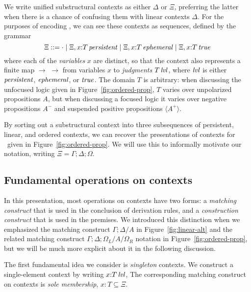 We write unified substructural contexts as either $\Delta$ or $\Xi$,
preferring the latter when there is a chance of confusing them with
linear contexts $\Delta$. For the purposes of encoding \ollll, we can
see these contexts as sequences, defined by the grammar
\[
\Xi ::= \cdot 
  \mid \Xi, x{:}{T}\,{{\it persistent}}
  \mid \Xi, x{:}{T}\,{{\it ephemeral}}
  \mid \Xi, x{:}{T}\,{{\it true}}
\]
where each of the {\em variables} $x$ are distinct, so that the context
also represents a finite map $\to$ $\rightarrow$ from variables $x$ to 
{\it judgments}
${T}\,{{\it lvl}}$, where ${\it lvl}$ is either ${\it persistent}$, ${\it ephemeral}$, or ${\it true}$. 
The domain $T$ is arbitrary: when
discussing the unfocused logic given in Figure~\ref{fig:ordered-prop},
$T$ varies over unpolarized propositions $A$, but when discussing a
focused logic it varies over negative propositions $A^-$ and suspended
positive propositions $\langle A^+ \rangle$. 

By sorting out a substructural context into three subsequences of
persistent, linear, and ordered contexts, we can recover the
presentations of contexts for \ollll~given in
Figure~\ref{fig:ordered-prop}. We will use this to informally motivate
our notation, writing $\Xi = \Gamma; \Delta; \Omega$.




\subsection{Fundamental operations on contexts}

In this presentation, most operations on contexts have two forms: a
{\it matching construct} that is used in the conclusion of derivation
rules, and a {\it construction construct} that is used in the
premises.  We introduced this distinction when we emphasized the
matching construct $\Gamma; \Delta/A$ in Figure~\ref{fig:linear-alt}
and the related matching construct $\Gamma; \Delta;
\Omega_L/A/\Omega_R$ notation in Figure~\ref{fig:ordered-prop}, but we
will be much more explicit about it in the following discussion.

The first fundamental idea we consider is {\it singleton} contexts.
We construct a single-element context by writing $x{:}{T}\,{{\it lvl}}$, The
corresponding matching construct on contexts is {\it sole membership},
$x{:}T \subseteq \Xi$.

